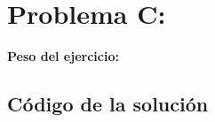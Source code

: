 \newpage{}
\section{Problema C: }
\textbf{Peso del ejercicio: }


\newpage
\subsection{Código de la solución}

